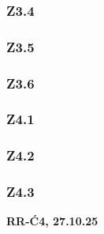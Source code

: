 \documentclass[10pt,a4paper]{article}
\newcommand{\zagadnienie}[3]{%
    \clearpage %
    \noindent\textbf{#1} #2\\
    #3
}
\begin{document}
{
    \subsubsection*{Z3.4}
    \begin{quote}
    \end{quote}

    \subsubsection*{Z3.5}
    \begin{quote}
    \end{quote}

    \subsubsection*{Z3.6}
    \begin{quote}
    \end{quote}
        
    \subsubsection*{Z4.1}
    \begin{quote}
    \end{quote}

    \subsubsection*{Z4.2}
    \begin{quote}
    \end{quote}

    \subsubsection*{Z4.3}
    \begin{quote}
    \end{quote}
}
\zagadnienie{RR-Ć4, 27.10.25}{}
{
}
\end{document}
